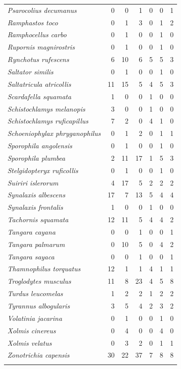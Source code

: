 \documentclass[12pt, A4]{article}
\begin{document}
\begin{longtable}{>{\itshape}lrrrrrr}
    Psarocolius decumanus & 0 & 0 & 1 & 0 & 0 & 1 \\ 
    Ramphastos toco & 0 & 1 & 3 & 0 & 1 & 2 \\ 
    Ramphocellus carbo & 0 & 1 & 0 & 0 & 1 & 0 \\ 
    Rupornis magnirostris & 0 & 1 & 0 & 0 & 1 & 0 \\ 
    Rynchotus rufescens & 6 & 10 & 6 & 5 & 5 & 3 \\ 
    Saltator similis & 0 & 1 & 0 & 0 & 1 & 0 \\ 
    Saltatricula atricollis & 11 & 15 & 5 & 4 & 5 & 3 \\ 
    Scardafella squamata & 1 & 0 & 0 & 1 & 0 & 0 \\ 
    Schistochlamys melanopis & 3 & 0 & 0 & 1 & 0 & 0 \\ 
    Schistochlamys ruficapillus & 7 & 2 & 0 & 4 & 1 & 0 \\ 
    Schoeniophylax phryganophilus & 0 & 1 & 2 & 0 & 1 & 1 \\ 
    Sporophila angolensis & 0 & 1 & 0 & 0 & 1 & 0 \\ 
    Sporophila plumbea & 2 & 11 & 17 & 1 & 5 & 3 \\ 
    Stelgidopteryx ruficollis & 0 & 1 & 0 & 0 & 1 & 0 \\ 
    Suiriri islerorum & 4 & 17 & 5 & 2 & 2 & 2 \\ 
    Synalaxis albescens & 17 & 7 & 13 & 5 & 4 & 4 \\ 
    Synalaxis frontalis & 1 & 0 & 0 & 1 & 0 & 0 \\ 
    Tachornis squamata & 12 & 11 & 5 & 4 & 4 & 2 \\ 
    Tangara cayana & 0 & 0 & 1 & 0 & 0 & 1 \\ 
    Tangara palmarum & 0 & 10 & 5 & 0 & 4 & 2 \\ 
    Tangara sayaca & 0 & 0 & 1 & 0 & 0 & 1 \\ 
    Thamnophilus torquatus & 12 & 1 & 1 & 4 & 1 & 1 \\ 
    Troglodytes musculus & 11 & 8 & 23 & 4 & 5 & 8 \\ 
    Turdus leucomelas & 1 & 2 & 2 & 1 & 2 & 2 \\ 
    Tyrannus albogularis & 3 & 5 & 4 & 2 & 3 & 2 \\ 
    Volatinia jacarina & 0 & 1 & 0 & 0 & 1 & 0 \\ 
    Xolmis cinereus & 0 & 4 & 0 & 0 & 4 & 0 \\ 
    Xolmis velatus & 0 & 3 & 2 & 0 & 1 & 1 \\ 
    Zonotrichia capensis & 30 & 22 & 37 & 7 & 8 & 8 \\ 
  \label{tab:aves1}
\end{longtable}
\end{document}
